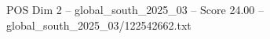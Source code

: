 \begin{textsample}{POS Dim 2 – global\_south\_2025\_03 – Score 24.00 – global\_south\_2025\_03/122542662.txt}
\end{textsample}
